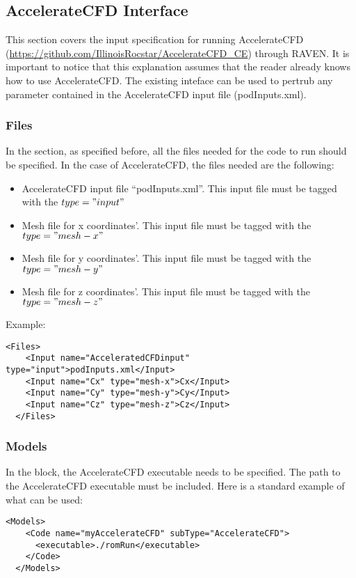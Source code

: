 \subsection{AccelerateCFD Interface}
\label{subsec:AccelerateCFDInterface}
This section covers the input specification for running AccelerateCFD
 (\url{https://github.com/IllinoisRocstar/AccelerateCFD_CE})
 through RAVEN. It is important to notice
that this explanation assumes that the reader already knows how to use AccelerateCFD. The existing inteface can be used to pertrub any parameter 
contained in the AccelerateCFD input file (podInputs.xml).

\subsubsection{Files}
In the  section, as specified before, all the files needed
for the code to run should be specified. In the case of AccelerateCFD,
 the files needed are the following:
\begin{itemize}
  \item AccelerateCFD input file ``podInputs.xml''. This input file must be tagged with 
          the $type="input"$
  \item Mesh file for x coordinates'. This input file must be tagged with 
          the $type="mesh-x"$
  \item Mesh file for y coordinates'. This input file must be tagged with 
          the $type="mesh-y"$
  \item Mesh file for z coordinates'. This input file must be tagged with 
          the $type="mesh-z"$
\end{itemize}
%
Example:
\begin{lstlisting}[style=XML]
  <Files>
    <Input name="AcceleratedCFDinput" type="input">podInputs.xml</Input>
    <Input name="Cx" type="mesh-x">Cx</Input>
    <Input name="Cy" type="mesh-y">Cy</Input>
    <Input name="Cz" type="mesh-z">Cz</Input>
  </Files>
\end{lstlisting}

\subsubsection{Models}
In the  block, the AccelerateCFD executable needs to be specified. 
The  path to the AccelerateCFD executable must be included.
 Here is a standard example of what can be used:
\begin{lstlisting}[style=XML]
  <Models>
    <Code name="myAccelerateCFD" subType="AccelerateCFD">
      <executable>./romRun</executable>
    </Code>
  </Models>
\end{lstlisting}

